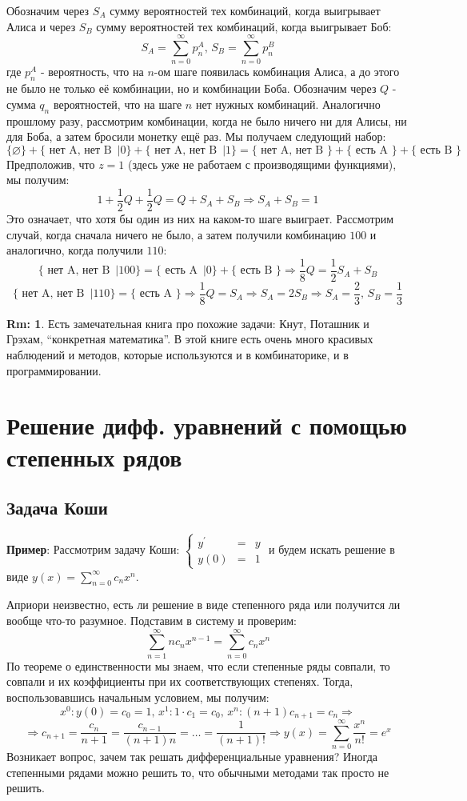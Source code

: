 \documentclass[12pt]{article}
\newcommand{\VN}{\varnothing}
\theoremstyle{definition}
\newtheorem{rem}{Rm:}
\newcommand{\ddsum}[2]{\displaystyle\sum\limits_{#1}^{#2}}
\begin{document}
Обозначим через $S_A$ сумму вероятностей тех комбинаций, когда выигрывает Алиса и через $S_B$ сумму вероятностей тех комбинаций, когда выигрывает Боб:
$$
	S_A = \ddsum{n = 0}{\infty}p_n^A, \, S_B = \ddsum{n = 0}{\infty}p_n^B
$$
где $p_n^A$ - вероятность, что на $n$-ом шаге появилась комбинация Алиса, а до этого не было не только её комбинации, но и комбинации Боба. Обозначим через $Q$ - сумма $q_n$ вероятностей, что на шаге $n$ нет нужных комбинаций. Аналогично прошлому разу, рассмотрим комбинации, когда не было ничего ни для Алисы, ни для Боба, а затем бросили монетку ещё раз. Мы получаем следующий набор:
$$
	\{\VN\} + \{\text{ нет A, нет B } \, |0\} + \{\text{ нет A, нет B } \, |1\} = 	\{\text{ нет A, нет B } \} + 	\{\text{ есть A } \} + \{\text{ есть B }\}
$$
Предположив, что $z =1$ (здесь уже не работаем с производящими функциями), мы получим:
$$
	1 + \dfrac{1}{2}Q + \dfrac{1}{2} Q = Q + S_A + S_B \Rightarrow S_A + S_B = 1
$$
Это означает, что хотя бы один из них на каком-то шаге выиграет. Рассмотрим случай, когда сначала ничего не было, а затем получили комбинацию $100$ и аналогично, когда получили $110$:
$$
	\{\text{ нет A, нет B } \, |100\}  = 	\{\text{ есть A }\, |0 \} + \{\text{ есть B }\} \Rightarrow \dfrac{1}{8}Q = \dfrac{1}{2}S_A + S_B
$$
$$
	\{\text{ нет A, нет B } \, |110\}  = 	\{\text{ есть A } \} \Rightarrow \dfrac{1}{8}Q = S_A \Rightarrow S_A = 2S_B \Rightarrow S_A = \dfrac{2}{3}, \, S_B = \dfrac{1}{3}
$$
\begin{rem}
	Есть замечательная книга про похожие задачи: Кнут, Поташник и Грэхам, ``конкретная математика''. В этой книге есть очень много красивых наблюдений и методов, которые используются и в комбинаторике, и в программировании.
\end{rem}
\newpage
\section*{Решение дифф. уравнений с помощью степенных рядов} 
\subsection*{Задача Коши}
\textbf{Пример}: Рассмотрим задачу Коши: $\left\{
\begin{array}{lcl}
		y^\prime &=& y \\
		y(0) &=& 1
\end{array}\right.$ и будем искать решение в виде $y(x) = \ddsum{n = 0}{\infty}c_n x^n$.

Априори неизвестно, есть ли решение в виде степенного ряда или получится ли вообще что-то разумное. Подставим в систему и проверим:
$$
	\ddsum{n = 1}{\infty}nc_nx^{n-1} = \ddsum{n = 0}{\infty}c_n x^n
$$
По теореме о единственности мы знаем, что если степенные ряды совпали, то совпали и их коэффициенты при их соответствующих степенях. Тогда, воспользовавшись начальным условием, мы получим:
$$
	x^0 \colon y(0) = c_0 = 1, \, x^1 \colon 1{\cdot}c_1 = c_0, \, x^n \colon (n+1) c_{n+1} = c_n \Rightarrow 
$$
$$	
	\Rightarrow c_{n+1} = \dfrac{c_n}{n+1} = \dfrac{c_{n-1}}{(n+1)n} = \dotsc = \dfrac{1}{(n+1)!} \Rightarrow y(x) = \ddsum{n = 0}{\infty}\dfrac{x^n}{n!} = e^x
$$
Возникает вопрос, зачем так решать дифференциальные уравнения? Иногда степенными рядами можно решить то, что обычными методами так просто не решить.
\end{document}
